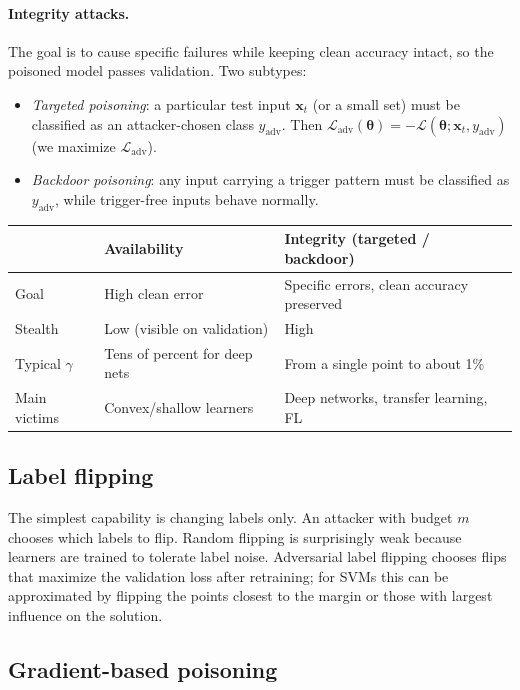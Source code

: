 \documentclass[10pt,a4paper]{extarticle}
\theoremstyle{definition}
\newcommand{\Loss}{\mathcal{L}}
\newcommand{\x}{\mathbf{x}}
\newcommand{\btheta}{\boldsymbol{\theta}}
\begin{document}
\paragraph{Integrity attacks.} The goal is to cause specific failures while keeping clean accuracy intact, so the poisoned model passes validation. Two subtypes:
\begin{itemize}
  \item \emph{Targeted poisoning}: a particular test input \(\x_t\) (or a small set) must be classified as an attacker-chosen class \(y_{\text{adv}}\). Then \(\Loss_{\text{adv}}(\btheta) = -\Loss(\btheta;\x_t,y_{\text{adv}})\) (we maximize \(\Loss_{\text{adv}}\)).
  \item \emph{Backdoor poisoning}: any input carrying a trigger pattern must be classified as \(y_{\text{adv}}\), while trigger-free inputs behave normally.
\end{itemize}

\begin{keybox}
\begin{tabularx}{\linewidth}{lXX}
 & Availability & Integrity (targeted / backdoor) \\
\hline
Goal & High clean error & Specific errors, clean accuracy preserved \\
Stealth & Low (visible on validation) & High \\
Typical \(\gamma\) & Tens of percent for deep nets & From a single point to about 1\% \\
Main victims & Convex/shallow learners & Deep networks, transfer learning, FL \\
\end{tabularx}
\end{keybox}

\subsection{Label flipping}

The simplest capability is changing labels only. An attacker with budget \(m\) chooses which labels to flip. Random flipping is surprisingly weak because learners are trained to tolerate label noise. Adversarial label flipping \citep{xiao2012labelflip} chooses flips that maximize the validation loss after retraining; for SVMs this can be approximated by flipping the points closest to the margin or those with largest influence on the solution.

\subsection{Gradient-based poisoning}
\end{document}

